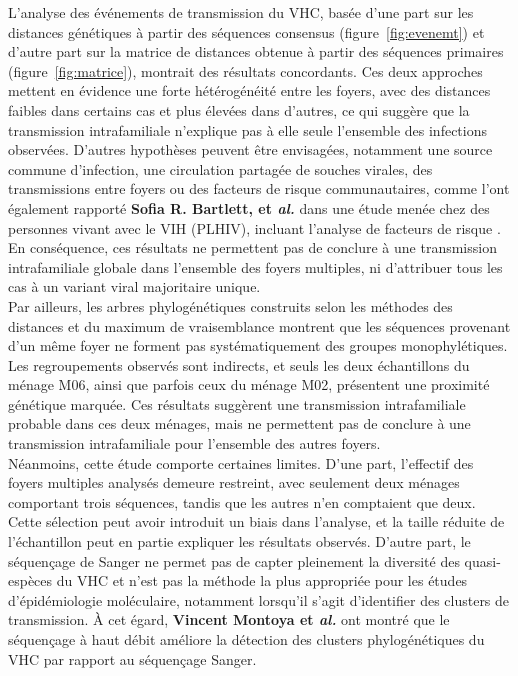 \documentclass[a4paper,12pt]{article}
\begin{document}
L’analyse des événements de transmission du VHC, basée d’une part sur les distances génétiques à partir des séquences consensus (figure~\ref{fig:evenemt})  et d’autre part sur la matrice de distances obtenue à partir des séquences primaires (figure~\ref{fig:matrice}), montrait des résultats concordants. Ces deux approches mettent en évidence une forte hétérogénéité entre les foyers, avec des distances faibles dans certains cas et plus élevées dans d’autres, ce qui suggère que la transmission intrafamiliale n’explique pas à elle seule l’ensemble des infections observées. D’autres hypothèses peuvent être envisagées, notamment une source commune d’infection, une circulation partagée de souches virales, des transmissions entre foyers ou des facteurs de risque communautaires, comme l’ont également rapporté  \textbf {Sofia R. Bartlett, et \textit{al.} } dans une étude menée chez des personnes vivant avec le VIH (PLHIV), incluant l’analyse de facteurs de risque \cite{bartlettPatternsCorrelatesHepatitis2022}. En conséquence, ces résultats ne permettent pas de conclure à une transmission intrafamiliale globale dans l’ensemble des foyers multiples, ni d’attribuer tous les cas à un variant viral majoritaire unique.\\


Par ailleurs, les arbres phylogénétiques construits selon les méthodes des distances et du maximum de vraisemblance montrent que les séquences provenant d’un même foyer ne forment pas systématiquement des groupes monophylétiques. Les regroupements observés sont indirects, et seuls les deux échantillons du ménage M06, ainsi que parfois ceux du ménage M02, présentent une proximité génétique marquée. Ces résultats suggèrent une transmission intrafamiliale probable dans ces deux ménages, mais ne permettent pas de conclure à une transmission intrafamiliale pour l’ensemble des autres foyers. \\


Néanmoins, cette étude comporte certaines limites. D’une part, l’effectif des foyers multiples analysés demeure restreint, avec seulement deux ménages comportant trois séquences, tandis que les autres n’en comptaient que deux. Cette sélection peut avoir introduit un biais dans l’analyse, et la taille réduite de l’échantillon peut en partie expliquer les résultats observés. D’autre part, le séquençage de Sanger ne permet pas de capter pleinement la diversité des quasi-espèces du VHC et n’est pas la méthode la plus appropriée pour les études d’épidémiologie moléculaire, notamment lorsqu’il s’agit d’identifier des clusters de transmission. À cet égard, \textbf{Vincent Montoya et \textit{al.}} \cite{montoyaDeepSequencingIncreases2016} ont montré que le séquençage à haut débit améliore la détection des clusters phylogénétiques du VHC par rapport au séquençage Sanger.
\end{document}
